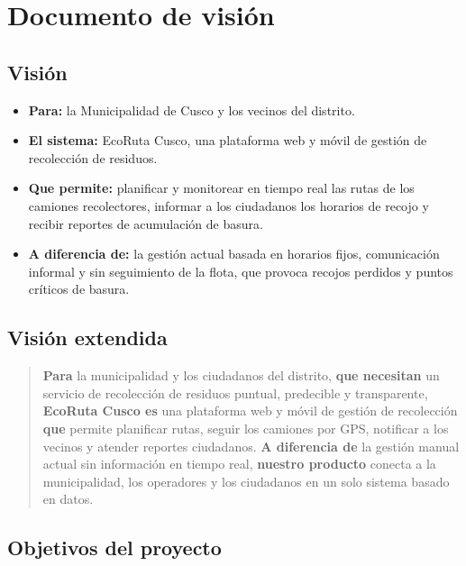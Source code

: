 \documentclass[11pt,a4paper]{article}
\begin{document}
\section{Documento de visión}

\subsection{Visión}

\begin{itemize}
  \item \textbf{Para:} la Municipalidad de Cusco y los vecinos del distrito.
  \item \textbf{El sistema:} EcoRuta Cusco, una plataforma web y móvil de gestión de recolección de residuos.
  \item \textbf{Que permite:} planificar y monitorear en tiempo real las rutas de los camiones recolectores, informar a los ciudadanos los horarios de recojo y recibir reportes de acumulación de basura.
  \item \textbf{A diferencia de:} la gestión actual basada en horarios fijos, comunicación informal y sin seguimiento de la flota, que provoca recojos perdidos y puntos críticos de basura.
\end{itemize}

\subsection{Visión extendida}

\begin{quote}
\colorbox{verdeclaro}{\parbox{0.92\linewidth}{\vspace{0.4em}
\textbf{Para} la municipalidad y los ciudadanos del distrito,
\textbf{que necesitan} un servicio de recolección de residuos puntual, predecible y transparente,
\textbf{EcoRuta Cusco es} una plataforma web y móvil de gestión de recolección
\textbf{que} permite planificar rutas, seguir los camiones por GPS, notificar a los vecinos y atender reportes ciudadanos.
\textbf{A diferencia de} la gestión manual actual sin información en tiempo real,
\textbf{nuestro producto} conecta a la municipalidad, los operadores y los ciudadanos en un solo sistema basado en datos.
\vspace{0.4em}}}
\end{quote}

\subsection{Objetivos del proyecto}
\end{document}
